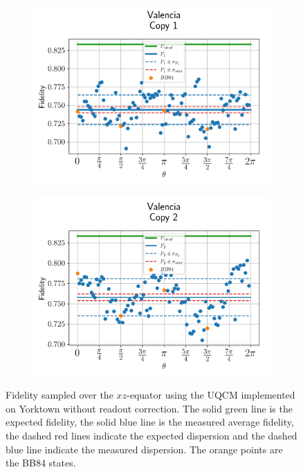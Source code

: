 \begin{figure}[H]
    \centering
    \begin{subfigure}{.45\textwidth}
      \centering
      \includegraphics[width=\textwidth]{Figures/UQCM/IBM/OnlyEquator/results_valencia_copy1.png}
    \end{subfigure}%
    \begin{subfigure}{.45\textwidth}
      \centering
      \includegraphics[width=\textwidth]{Figures/UQCM/IBM/OnlyEquator/results_valencia_copy2.png}
    \end{subfigure}
    \caption{Fidelity sampled over the $xz$-equator using the UQCM implemented on Yorktown without readout correction. The solid green line is the expected fidelity, the solid blue line is the measured average fidelity, the dashed red lines indicate the expected dispersion and the dashed blue line indicate the measured dispersion. The orange points are the BB84 states.}
\end{figure}


